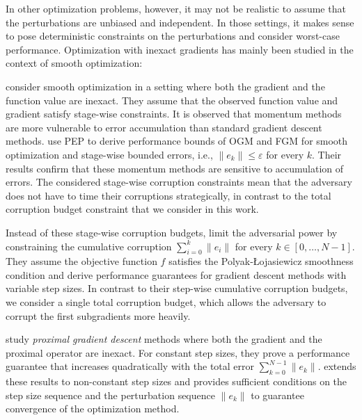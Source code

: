 \documentclass{article}
\begin{document}
In other optimization problems, however, it may not be realistic to assume that the perturbations are unbiased and independent. In those settings, it makes sense to pose deterministic constraints on the perturbations and consider worst-case performance. Optimization with inexact gradients has mainly been studied in the context of smooth optimization:

\citet{devolder2014first} consider smooth optimization in a setting where both the gradient and the function value are inexact. They assume that the observed function value and gradient satisfy stage-wise constraints.
It is observed that momentum methods are more vulnerable to error accumulation than standard gradient descent methods.
\citet{liu2024nonasymptotic} use PEP to derive performance bounds of OGM and FGM for smooth optimization and stage-wise bounded errors, i.e., $\|e_k\|\le \varepsilon$ for every $k$. Their results confirm that these momentum methods are sensitive to accumulation of errors. The considered stage-wise corruption constraints mean that the adversary does not have to time their corruptions strategically, in contrast to the total corruption budget constraint that we consider in this work.

Instead of these stage-wise corruption budgets, \citet{chang_gradient_2022} limit the adversarial power by constraining the cumulative corruption $\sum_{i=0}^k\|e_i\|$ for every $k\in [0, \dots, N-1]$. They assume the objective function $f$ satisfies the Polyak-\L{}ojasiewicz smoothness condition and derive performance guarantees for gradient descent methods with variable step sizes.
In contrast to their step-wise cumulative corruption budgets, we consider a single total corruption budget, which allows the adversary to corrupt the first subgradients more heavily.

\citet{schmidt_convergence_2011} study \emph{proximal gradient descent} methods where both the gradient and the proximal operator are inexact. For constant step sizes, they prove a performance guarantee that increases quadratically with the total error $\sum_{k=0}^{N-1}\|e_k\|$.
\citet[Theorem 2]{atchade2017perturbed} extends these results to non-constant step sizes and provides sufficient conditions on the step size sequence and the perturbation sequence $\|e_k\|$ to guarantee convergence of the optimization method.
\end{document}
